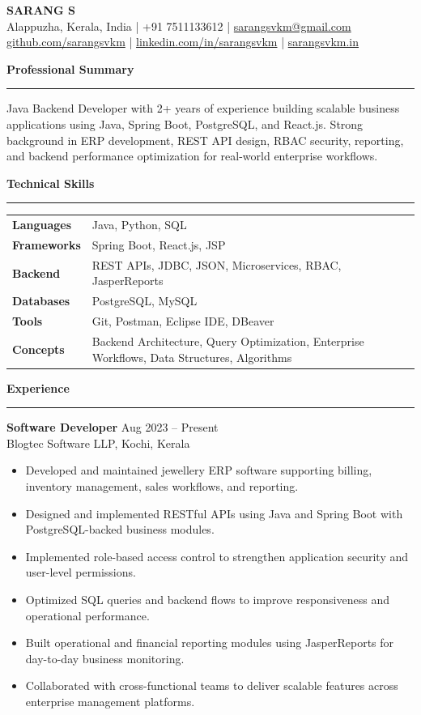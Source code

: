 \documentclass[a4paper,10pt]{article}
\newcommand{\resheading}[1]{\vspace{8pt}\textbf{\large #1}\par\hrule\vspace{4pt}}
\begin{document}
\begin{center}
{\LARGE \textbf{SARANG S}}\\
Alappuzha, Kerala, India \quad | \quad +91 7511133612 \quad | \quad \href{mailto:sarangsvkm@gmail.com}{sarangsvkm@gmail.com}\\
\href{https://github.com/sarangsvkm}{github.com/sarangsvkm} \quad | \quad
\href{https://linkedin.com/in/sarangsvkm}{linkedin.com/in/sarangsvkm} \quad | \quad
\href{https://sarangsvkm.in}{sarangsvkm.in}
\end{center}

\resheading{Professional Summary}
Java Backend Developer with 2+ years of experience building scalable business applications using Java, Spring Boot, PostgreSQL, and React.js. Strong background in ERP development, REST API design, RBAC security, reporting, and backend performance optimization for real-world enterprise workflows.

\resheading{Technical Skills}
\begin{tabular}{>{\raggedright\arraybackslash}p{2.3cm} p{13.2cm}}
\textbf{Languages} & Java, Python, SQL \\
\textbf{Frameworks} & Spring Boot, React.js, JSP \\
\textbf{Backend} & REST APIs, JDBC, JSON, Microservices, RBAC, JasperReports \\
\textbf{Databases} & PostgreSQL, MySQL \\
\textbf{Tools} & Git, Postman, Eclipse IDE, DBeaver \\
\textbf{Concepts} & Backend Architecture, Query Optimization, Enterprise Workflows, Data Structures, Algorithms \\
\end{tabular}

\resheading{Experience}
\textbf{Software Developer} \hfill Aug 2023 -- Present\\
Blogtec Software LLP, Kochi, Kerala
\begin{itemize}
\item Developed and maintained jewellery ERP software supporting billing, inventory management, sales workflows, and reporting.
\item Designed and implemented RESTful APIs using Java and Spring Boot with PostgreSQL-backed business modules.
\item Implemented role-based access control to strengthen application security and user-level permissions.
\item Optimized SQL queries and backend flows to improve responsiveness and operational performance.
\item Built operational and financial reporting modules using JasperReports for day-to-day business monitoring.
\item Collaborated with cross-functional teams to deliver scalable features across enterprise management platforms.
\end{itemize}
\end{document}
